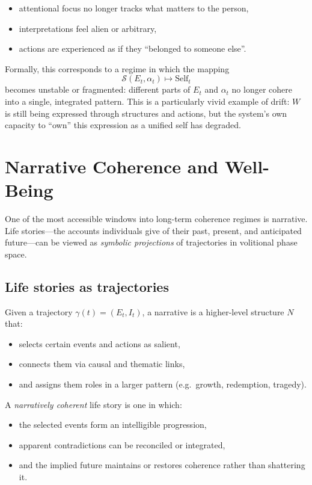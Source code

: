 \documentclass[12pt,a4paper]{report}
\newcommand{\Will}{W}
\begin{document}
\begin{itemize}[leftmargin=2em]
    \item attentional focus no longer tracks what matters to the person,
    \item interpretations feel alien or arbitrary,
    \item actions are experienced as if they ``belonged to someone else''.
\end{itemize}

Formally, this corresponds to a regime in which the mapping
\[
    \mathcal{S}(E_t, \alpha_t) \mapsto \text{Self}_t
\]
becomes unstable or fragmented: different parts of \(E_t\) and \(\alpha_t\) no longer cohere into a single, integrated pattern. This is a particularly vivid example of drift: \(\Will\) is still being expressed through structures and actions, but the system's own capacity to ``own'' this expression as a unified self has degraded.

\section{Narrative Coherence and Well-Being}

One of the most accessible windows into long-term coherence regimes is narrative. Life stories---the accounts individuals give of their past, present, and anticipated future---can be viewed as \emph{symbolic projections} of trajectories in volitional phase space.

\subsection*{Life stories as trajectories}

Given a trajectory \(\gamma(t) = (E_t, I_t)\), a narrative is a higher-level structure \(N\) that:

\begin{itemize}[leftmargin=2em]
    \item selects certain events and actions as salient,
    \item connects them via causal and thematic links,
    \item and assigns them roles in a larger pattern (e.g.\ growth, redemption, tragedy).
\end{itemize}

A \emph{narratively coherent} life story is one in which:

\begin{itemize}[leftmargin=2em]
    \item the selected events form an intelligible progression,
    \item apparent contradictions can be reconciled or integrated,
    \item and the implied future maintains or restores coherence rather than shattering it.
\end{itemize}
\end{document}
